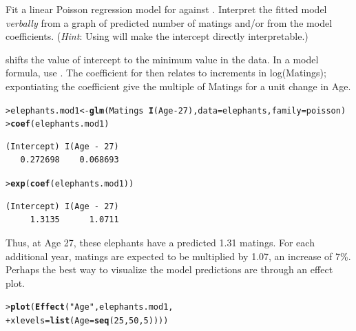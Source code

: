 \documentclass[10pt]{report}\usepackage[]{graphicx}\usepackage[]{color}
\makeatletter
\newcommand{\hlnum}[1]{\textcolor[rgb]{0.686,0.059,0.569}{#1}}%
\newcommand{\hlstr}[1]{\textcolor[rgb]{0.192,0.494,0.8}{#1}}%
\newcommand{\hlopt}[1]{\textcolor[rgb]{0,0,0}{#1}}%
\newcommand{\hlstd}[1]{\textcolor[rgb]{0.345,0.345,0.345}{#1}}%
\newcommand{\hlkwb}[1]{\textcolor[rgb]{0.69,0.353,0.396}{#1}}%
\newcommand{\hlkwc}[1]{\textcolor[rgb]{0.333,0.667,0.333}{#1}}%
\newcommand{\hlkwd}[1]{\textcolor[rgb]{0.737,0.353,0.396}{\textbf{#1}}}%
\newenvironment{kframe}{%
 \def\at@end@of@kframe{}%
 \ifinner\ifhmode%
  \def\at@end@of@kframe{\end{minipage}}%
  \begin{minipage}{\columnwidth}%
 \fi\fi%
 \def\FrameCommand##1{\hskip\@totalleftmargin \hskip-\fboxsep
 \colorbox{shadecolor}{##1}\hskip-\fboxsep
     \hskip-\linewidth \hskip-\@totalleftmargin \hskip\columnwidth}%
 \MakeFramed {\advance\hsize-\width
   \@totalleftmargin\z@ \linewidth\hsize
   \@setminipage}}%
 {\par\unskip\endMakeFramed%
 \at@end@of@kframe}
\newenvironment{knitrout}{}{} %
\renewenvironment{knitrout}{\small\renewcommand{\baselinestretch}{.85}}{} %
\makeatother
\begin{document}
\begin{Exercises}
\begin{enumerate*}
    \item Fit a linear Poisson regression model for  against .  Interpret the
    fitted model \emph{verbally} from a graph of predicted number of matings and/or from the model
    coefficients. (\emph{Hint}: Using  will make the intercept directly interpretable.)
    \begin{ans}
     shifts the value of intercept to the minimum value in the data. In a model formula,
    use . The coefficient for  then relates to increments in log(Matings);
    expontiating the coefficient give the multiple of Matings for a unit change in Age.
\begin{knitrout}\footnotesize
{}\color{fgcolor}\begin{kframe}
\begin{alltt}
\hlstd{> }\hlstd{elephants.mod1} \hlkwb{<-} \hlkwd{glm}\hlstd{(Matings} \hlopt{~} \hlkwd{I}\hlstd{(Age}\hlopt{-}\hlnum{27}\hlstd{),} \hlkwc{data}\hlstd{=elephants,} \hlkwc{family}\hlstd{=poisson)}
\hlstd{> }\hlkwd{coef}\hlstd{(elephants.mod1)}
\end{alltt}
\begin{verbatim}
(Intercept) I(Age - 27) 
   0.272698    0.068693 
\end{verbatim}
\begin{alltt}
\hlstd{> }\hlkwd{exp}\hlstd{(}\hlkwd{coef}\hlstd{(elephants.mod1))}
\end{alltt}
\begin{verbatim}
(Intercept) I(Age - 27) 
     1.3135      1.0711 
\end{verbatim}
\end{kframe}
\end{knitrout}

    Thus, at Age 27, these elephants have a predicted 1.31 matings.  For each additional year,
    matings are expected to be multiplied by 1.07, an increase of 7\%.
    Perhaps the best way to visualize the model predictions are through an effect plot.

\begin{knitrout}\footnotesize
{}\color{fgcolor}\begin{kframe}
\begin{alltt}
\hlstd{> }\hlkwd{plot}\hlstd{(}\hlkwd{Effect}\hlstd{(}\hlstr{"Age"}\hlstd{, elephants.mod1,}
\hlstd{+ }            \hlkwc{xlevels}\hlstd{=}\hlkwd{list}\hlstd{(}\hlkwc{Age}\hlstd{=}\hlkwd{seq}\hlstd{(}\hlnum{25}\hlstd{,}\hlnum{50}\hlstd{,}\hlnum{5}\hlstd{))))}
\end{alltt}
\end{kframe}


\end{knitrout}
\end{ans}
\end{enumerate*}
\end{Exercises}
\end{document}
